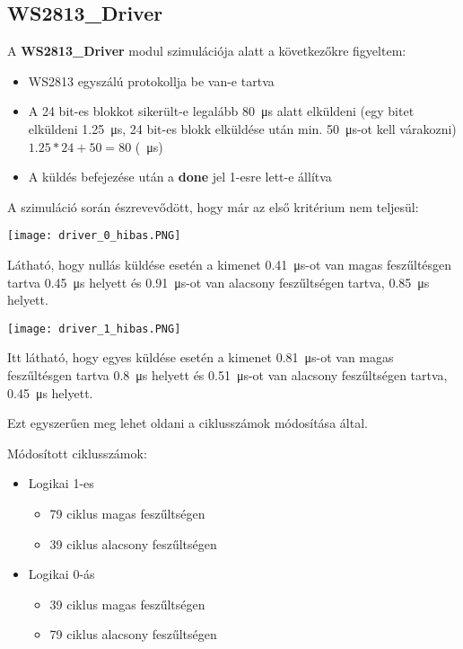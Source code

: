 \subsection{WS2813\_Driver}

A \textbf{WS2813\_Driver} modul szimulációja alatt a következőkre figyeltem:
\begin{itemize}
	\item WS2813 egyszálú protokollja be van-e tartva
	\item A 24 bit-es blokkot sikerült-e legalább \SI{80}{\micro\second} alatt elküldeni (egy bitet elküldeni \SI{1.25}{\micro\second}, 24 bit-es blokk elküldése után min. \SI{50}{\micro\second}-ot kell várakozni) $1.25 * 24 + 50 = 80$ (\SI{}{\micro\second})
	\item A küldés befejezése után a \textbf{done} jel 1-esre lett-e állítva
\end{itemize}

A szimuláció során észrevevődött, hogy már az első kritérium nem teljesül:

\texttt{[image: driver\_0\_hibas.PNG]}

Látható, hogy nullás küldése esetén a kimenet \SI{0.41}{\micro\second}-ot van magas feszűltésgen tartva \SI{0.45}{\micro\second} helyett és \SI{0.91}{\micro\second}-ot van
alacsony feszűltségen tartva, \SI{0.85}{\micro\second} helyett.

\texttt{[image: driver\_1\_hibas.PNG]}

Itt látható, hogy egyes küldése esetén a kimenet \SI{0.81}{\micro\second}-ot van magas feszűltésgen tartva \SI{0.8}{\micro\second} helyett és \SI{0.51}{\micro\second}-ot van
alacsony feszűltségen tartva, \SI{0.45}{\micro\second} helyett.

Ezt egyszerűen meg lehet oldani a ciklusszámok módosítása által.

Módosított ciklusszámok:

\begin{itemize}
\item Logikai 1-es
	\begin{itemize}
	\item 79 ciklus magas feszűltségen
	\item 39 ciklus alacsony feszűltségen
	\end{itemize}
\item Logikai 0-ás
	\begin{itemize}
	\item 39 ciklus magas feszűltségen
	\item 79 ciklus alacsony feszűltségen
	\end{itemize}
\end{itemize}

